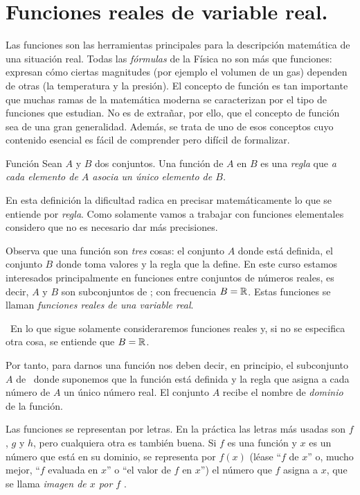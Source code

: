 \documentclass[oneside,spanish,2m,twoside,svgnames,x11names,HTML,12pt]{libro-matua}\usepackage[]{graphicx}\usepackage[]{color}
\begin{document}
\vspace*{-1mm}


\section{Funciones reales de variable real.}

Las funciones son las herramientas principales para la descripción
matemática de una situación real. Todas las \emph{fórmulas} de la
Física no son más que funciones: expresan cómo ciertas magnitudes
(por ejemplo el volumen de un gas) dependen de otras (la temperatura
y la presión). El concepto de función es tan importante que muchas
ramas de la matemática moderna se caracterizan por el tipo de funciones
que estudian. No es de extrañar, por ello, que el concepto de función
sea de una gran generalidad. Además, se trata de uno de esos conceptos
cuyo contenido esencial es fácil de comprender pero difícil de formalizar.

\begin{defi}{Función}{} Sean $A$ y $B$ dos conjuntos. Una función
de $A$ en $B$ es una \emph{regla} que \emph{a cada elemento de $A$
asocia un único elemento de $B$.} \end{defi}

En esta definición la dificultad radica en precisar matemáticamente
lo que se entiende por \emph{regla}. Como solamente vamos a trabajar
con funciones elementales considero que no es necesario dar más precisiones.

Observa que una función son \emph{tres} cosas: el conjunto $A$ donde
está definida, el conjunto $B$ donde toma valores y la regla que
la define. En este curso estamos interesados principalmente en funciones
entre conjuntos de números reales, es decir, $A$ y $B$ son subconjuntos
de \R; con frecuencia $B=\mathbb R$. Estas funciones se llaman \emph{funciones
reales de una variable real}.

\ En lo que sigue solamente consideraremos
funciones reales y, si no se especifica otra cosa, se entiende que
$B=\mathbb R$.

Por tanto, para darnos una función nos deben decir, en principio,
el subconjunto $A$ de \R\ donde suponemos que la función está definida
y la regla que asigna a cada número de $A$ un único número real.
El conjunto $A$ recibe el nombre de \emph{dominio} de la función.

Las funciones se representan por letras. En la práctica las letras
más usadas son $f$, $g$ y $h$, pero cualquiera otra es también
buena. Si $f$ es una función y $x$ es un número que está en su dominio,
se representa por $f(x)$ (léase ``$f$ de $x$'' o, mucho mejor,
``$f$ evaluada en $x$'' o ``el valor de $f$ en $x$'') el número
que $f$ asigna a $x$, que se llama \emph{imagen de $x$ por $f$
}.
\end{document}
